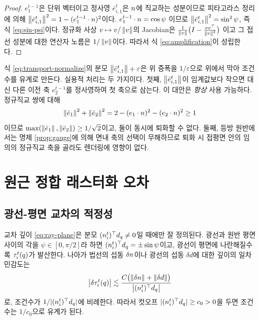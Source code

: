 \begin{proof}
$e^{t-1}_1$은 단위 벡터이고 정사영 $\bar e^t_{i,1}$은 $n$에 직교하는 성분이므로
피타고라스 정리에 의해
$\left\lVert \bar e^t_{i,1} \right\rVert^2 = 1-(e^{t-1}_1\cdot n)^2$이다. $e^{t-1}_1\cdot n=\cos\psi$
이므로 $\left\lVert \bar e^t_{i,1} \right\rVert^2 = \sin^2\psi$, 즉 식 \eqref{eq:sin-psi}이다. 정규화 사상
$v\mapsto v/\left\lVert v \right\rVert$의 Jacobian은 $\frac{1}{\left\lVert v \right\rVert}\bigl(I - \frac{vv^{\top}}{\left\lVert v \right\rVert^2}\bigr)$
이고 그 접선 성분에 대한 연산자 노름은 $1/\left\lVert v \right\rVert$이다. 따라서 식
\eqref{eq:amplification}이 성립한다.
\end{proof}

\begin{remark}
식 \eqref{eq:transport-normalize}의 분모 $\left\lVert \bar e^t_{i,1} \right\rVert+\varepsilon$은 위
증폭을 $1/\varepsilon$으로 위에서 막아 조건수를 유계로 만든다. 실용적 처리는 두
가지이다. 첫째, $\left\lVert \bar e^t_{i,1} \right\rVert$이 임계값보다 작으면 대신 다른 이전 축
$e^{t-1}_2$를 정사영하여 첫 축으로 삼는다. 이 대안은 \emph{항상} 사용 가능하다.
정규직교 쌍에 대해
\[
  \left\lVert \bar e_1 \right\rVert^2 + \left\lVert \bar e_2 \right\rVert^2
  = 2 - (e_1\cdot n)^2 - (e_2\cdot n)^2 \ge 1
\]
이므로 $\max(\left\lVert \bar e_1 \right\rVert,\left\lVert \bar e_2 \right\rVert) \ge 1/\sqrt2$이고, 둘이 동시에 퇴화할 수
없다. 둘째, 등방 원반에서는 명제 \ref{prop:gauge}에 의해 면내 축의 선택이 무해하므로
퇴화 시 접평면 안의 임의의 정규직교 축을 골라도 렌더링에 영향이 없다.
\end{remark}

\section{원근 정합 래스터화 오차}
\label{sec:raster-error}

\subsection{광선-평면 교차의 적정성}

\begin{proposition}
\label{prop:ray-plane}
교차 깊이 \eqref{eq:ray-plane}은 분모 $(n^t_i)^{\top}d_q \ne 0$일 때에만 잘
정의된다. 광선과 원반 평면 사이의 각을 $\psi\in[0,\pi/2]$라 하면
$(n^t_i)^{\top}d_q = \pm\sin\psi$이고, 광선이 평면에 나란해질수록
$\tau^t_i(q)$가 발산한다. 나아가 법선의 섭동 $\delta n$이나 광선의 섭동
$\delta d$에 대한 깊이의 일차 민감도는
\begin{equation}
  \left\lvert \delta \tau^t_i(q) \right\rvert
  \lesssim \frac{C\bigl(\left\lVert \delta n \right\rVert+\left\lVert \delta d \right\rVert\bigr)}
                {\bigl\lvert(n^t_i)^{\top}d_q\bigr\rvert}
  \label{eq:depth-conditioning}
\end{equation}
로, 조건수가 $1/\lvert(n^t_i)^{\top}d_q\rvert$에 비례한다. 따라서 컷오프
$\lvert(n^t_i)^{\top}d_q\rvert \ge c_0 > 0$을 두면 조건수는 $1/c_0$으로 유계가
된다.
\end{proposition}

